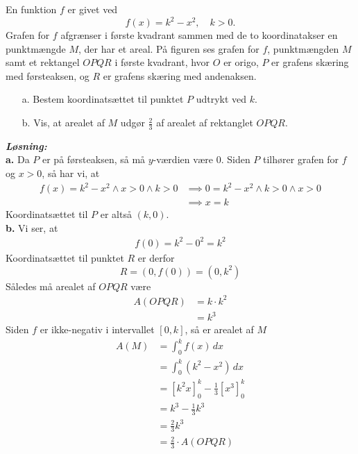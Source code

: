 \documentclass{article}
\newcommand{\sol}{\setlength{\parindent}{0cm}\textbf{\textit{Løsning:}}\setlength{\parindent}{1cm}}
\begin{document}
\begin{question}{}{}
  En funktion $f$ er givet ved
  \[
  f(x)= k^2-x^2, \quad k>0.
  \] 
Grafen for $f$ afgrænser i første kvadrant sammen med de to
koordinatakser en punktmængde $M$, der har et areal.
På figuren ses grafen for $f$, punktmængden $M$ samt et rektangel $OPQR$ i første kvadrant, hvor $O$ er origo, $P$ er grafens skæring med førsteaksen, og $R$ er grafens skæring med andenaksen.
\begin{itemize}
  \item[a.] Bestem koordinatsættet til punktet $P$ udtrykt ved $k.$
  \item[b.] Vis, at arealet af $M$ udgør $\frac23$ af arealet af rektanglet $OPQR.$
\end{itemize}
\end{question}
\sol \\
\textbf{a.}
Da $P$ er på førsteaksen, så må $y$-værdien være $0$. 
Siden $P$ tilhører grafen for $f$ og $x>0$, så har vi, at
\begin{equation*}
\begin{split}
  f(x)= k^2-x^2 \land x>0 \land k>0&\implies 0=k^2-x^2 \land k>0 \land x>0\\ 
  &\implies x=k
\end{split}
\end{equation*}
Koordinatsættet til $P$ er altså $(k,0)$. \\[1ex]
\textbf{b.}
Vi ser, at
\begin{equation*}
\begin{split}
  f(0)= k^2-0^2=k^2
\end{split}
\end{equation*}
Koordinatsættet til punktet $R$ er derfor
\[
R=\left(0,f(0)\right) =\left(0,k^2\right) 
\] 
Således må arealet af $OPQR$ være
\begin{equation*}
\begin{split}
  A(OPQR)&=k \cdot k^2\\ 
  &=k^3
\end{split}
\end{equation*}
Siden $f$ er ikke-negativ i intervallet $[0,k]$, så er arealet af $M$ 
\begin{equation*}
\begin{split}
  A(M)&=\int_{0}^{k} f(x) \,dx \\ 
  &=\int_{0}^{k} \left(k^2-x^2\right)  \,dx \\ 
  &=\left[k^2x\right]_{0}^k-\frac{1}{3}\left[x^3\right]_{0}^k\\ 
  &=k^3-\frac{1}{3}k^3\\ 
  &=\frac{2}{3}k^3\\ 
  &=\frac{2}{3} \cdot A(OPQR)
\end{split}
\end{equation*}
\end{document}
